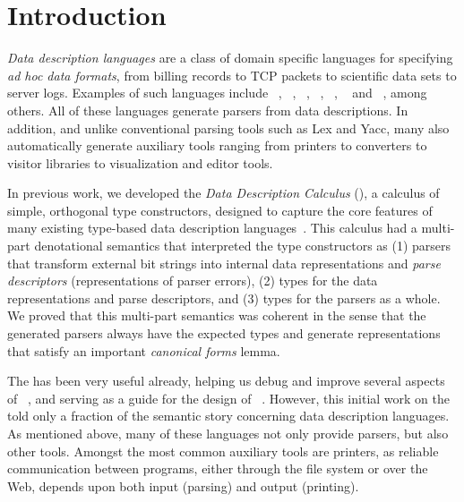\section{Introduction}
\label{sec:intro}

{\em Data description languages} are a class of domain specific
languages for specifying {\em ad hoc data formats}, from billing 
records to TCP packets to scientific data sets to server logs.  Examples 
of such languages include 
\bro~\cite{paxson:bro}, \datascript{}~\cite{gpce02}, \demeter~\cite{lieberherr+:class-dictionaries},
\packettypes{}~\cite{sigcomm00}, \padsc{}~\cite{fisher+:pads}, 
\padsml{}~\cite{mandelbaum+:padsml}  and
\xsugar~\cite{xsugar2005}, among others.  All of these languages
generate parsers from data descriptions.  In addition, and unlike
conventional parsing tools such as Lex and Yacc, many also automatically
generate auxiliary tools ranging from printers to \xml{} converters to
visitor libraries to visualization and editor tools.

In previous work, we developed the {\em Data Description Calculus}
(\ddcold{}), a calculus of simple, orthogonal type constructors,
designed to capture the core features of many existing type-based data
description languages~\cite{fisher+:next700ddl,fisher+:ddcjournal}.
This calculus had a multi-part denotational semantics that interpreted
the type constructors as (1) parsers that transform external bit
strings into internal data representations and {\em parse descriptors}
(representations of parser errors), (2) types for the data
representations and parse descriptors, and (3) types for the parsers
as a whole.  We proved that this multi-part semantics was coherent in
the sense that the generated parsers always have the expected types
and generate representations that satisfy an important {\em
canonical forms} lemma.

The \ddcold{} has been very useful already, helping us debug and
improve several aspects of \padsc{}~\cite{fisher+:pads}, and serving
as a guide for the design of \linebreak \padsml{}~\cite{mandelbaum+:padsml}.
However, this initial work on the \ddcold{} told only a fraction of the
semantic story concerning data description languages.  As mentioned
above, many of these languages not only provide parsers, but
also other tools.  Amongst the most common auxiliary tools
are printers, as reliable communication between programs, either through
the file system or over the Web, depends upon both input (parsing) 
and output (printing).

